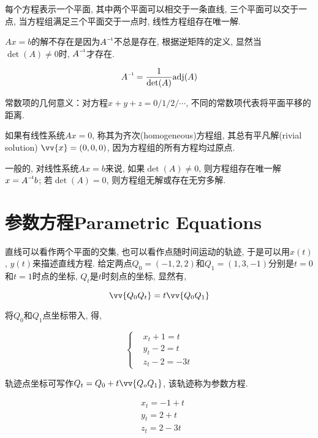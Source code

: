 每个方程表示一个平面, 其中两个平面可以相交于一条直线, 三个平面可以交于一点, 当方程组满足三个平面交于一点时, 线性方程组存在唯一解.

$ Ax=b $的解不存在是因为$ \inv{A} $不总是存在, 根据逆矩阵的定义, 显然当$ \det(A)\ne 0 $时, $ \inv{A} $才存在.

\begin{equation}
\inv{A} = \frac{1}{\det(A)}\adj{A}
\end{equation}

常数项的几何意义：对方程$ x+y+z=0/1/2/\cdots $, 不同的常数项代表将平面平移的距离.

如果有线性系统$ Ax=0 $, 称其为齐次(homogeneous)方程组, 其总有平凡解(rivial solution) $ \vv{x}=(0,0,0) $, 因为方程组的所有方程均过原点.

一般的, 对线性系统$ Ax=b $来说, 如果$ \det(A)\ne 0 $, 则方程组存在唯一解$ x=\inv{A}b $; 若$ \det(A) = 0 $, 则方程组无解或存在无穷多解.

\section{参数方程Parametric Equations}

直线可以看作两个平面的交集, 也可以看作点随时间运动的轨迹, 于是可以用$ x(t) $, $ y(t) $来描述直线方程. 给定两点$ Q_0=(-1,2,2) $和$ Q_1=(1,3,-1) $分别是$ t=0 $和$ t=1 $时点的坐标, $ Q_t $是$ t $时刻点的坐标, 显然有,

\begin{equation}
\vv{Q_0 Q_t}=t\vv{Q_0 Q_1}
\end{equation}

将$ Q_0 $和$ Q_1 $点坐标带入, 得,

\begin{equation}
\begin{cases}
& x_t + 1 = t \\
& y_t - 2 = t \\
& z_t - 2 = -3t
\end{cases}
\end{equation}

轨迹点坐标可写作$ Q_t=Q_0 + t\vv{Q_o Q_1} $, 该轨迹称为参数方程.

\begin{equation}
\begin{aligned}
& x_t = -1 + t \\
& y_t = 2 + t \\
& z_t = 2 - 3t
\end{aligned}
\end{equation}

